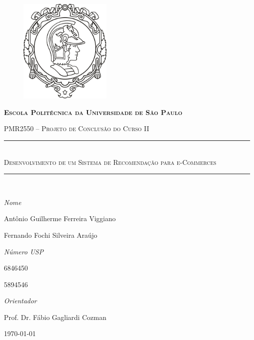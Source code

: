 \begin{center}
\begin{figure}[ht]
    \begin{center}
    \includegraphics[width=0.4\textwidth]{img/logo_poli}
    \end{center}
    \label{logo_poli}
\end{figure}
\end{center}

\begin{center}
\textbf{\textsc{Escola Politécnica da Universidade de São Paulo}}

\textsc{PMR2550 -- Projeto de Conclusão do Curso II}
\end{center}
\begin{center}
\vspace{2cm}
\hrule  ~\\[0.5cm]
{ \huge \textsc{Desenvolvimento de um Sistema de Recomendação para e-Commerces}}\\[0.8cm]

\hrule  ~\\[0.5cm]

\end{center}


\vfill

\begin{minipage}{0.65\textwidth} 
	\large\emph{Nome} 
	
	\large{Antônio Guilherme Ferreira Viggiano}
		
	\large{Fernando Fochi Silveira Araújo}  

\end{minipage}
\begin{minipage}{0.35\textwidth} 
	\large\emph{Número USP}
	
	6846450
	
	5894546
\end{minipage}

\vfill

\begin{center}
	\large\emph{Orientador}

	\large{Prof. Dr. Fábio Gagliardi Cozman}
\end{center}

\vfill

\begin{center}
	\today
\end{center}
